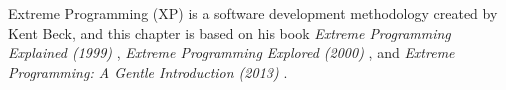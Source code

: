 Extreme Programming (XP) is a software development methodology created by Kent Beck, and this chapter is based on his book \textit{Extreme Programming Explained (1999)} \citep{xp:explained}, \textit{Extreme Programming Explored (2000)} \citep{xp:explored}, and \textit{Extreme Programming: A Gentle Introduction (2013)} \citep{xp:online}.

